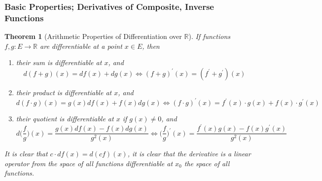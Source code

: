 \documentclass{article}
\newtheorem{theorem}{Theorem}[section]
\theoremstyle{remark}
\theoremstyle{definition}
\begin{document}
\subsubsection{Basic Properties; Derivatives of Composite, Inverse Functions}
\begin{theorem}[Arithmetic Properties of Differentiation over $\mathbb{R}$]
If functions $f, g: E \longrightarrow \mathbb{R}$ are differentiable at a point $x \in E$, then 
\begin{enumerate}
    \item their sum is differentiable at $x$, and 
    \[d(f+g) (x) = df(x) + dg(x) \iff (f+g)^\prime (x) = (f^\prime + g^\prime) (x)\]
    \item their product is differentiable at $x$, and 
    \[d (f \cdot g) (x) = g(x) df(x) + f(x) dg(x) \iff (f \cdot g)^\prime (x) = f^\prime (x) \cdot g(x) + f(x) \cdot g^\prime (x)\]
    \item their quotient is differentiable at $x$ if $g(x) \neq 0$, and 
    \[d \Big( \frac{f}{g} \Big) (x) =  \frac{g(x) df(x) - f(x) dg(x)}{g^2 (x)} \iff \bigg(\frac{f}{g}\bigg)^\prime (x) = \frac{f^\prime (x) g(x) - f(x) g^\prime (x)}{g^2 (x)}\]
\end{enumerate}
It is clear that $c\cdot df(x) = d (cf)(x)$, it is clear that the derivative is a linear operator from the space of all functions differentiable at $x_0$ the space of all functions. 
\end{theorem}
\end{document}

